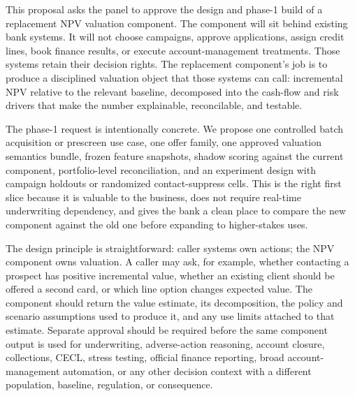 \documentclass[11pt]{article}
\newcommand{\1}{\mathbf{1}}
\begin{document}
This proposal asks the panel to approve the design and phase-1 build of a
replacement NPV valuation component. The component will sit behind existing
bank systems. It will not choose campaigns, approve applications, assign credit
lines, book finance results, or execute account-management treatments. Those
systems retain their decision rights. The replacement component's job is to
produce a disciplined valuation object that those systems can call: incremental
NPV relative to the relevant baseline, decomposed into the cash-flow and risk
drivers that make the number explainable, reconcilable, and testable.

The phase-1 request is intentionally concrete. We propose one controlled batch
acquisition or prescreen use case, one offer family, one approved valuation
semantics bundle, frozen feature snapshots, shadow scoring against the current
component, portfolio-level reconciliation, and an experiment design with
campaign holdouts or randomized contact-suppress cells. This is the right first
slice because it is valuable to the business, does not require real-time
underwriting dependency, and gives the bank a clean place to compare the new
component against the old one before expanding to higher-stakes uses.

The design principle is straightforward: caller systems own actions; the NPV
component owns valuation. A caller may ask, for example, whether contacting a
prospect has positive incremental value, whether an existing client should be
offered a second card, or which line option changes expected value. The
component should return the value estimate, its decomposition, the policy and
scenario assumptions used to produce it, and any use limits attached to that
estimate. Separate approval should be required before the same component output
is used for underwriting, adverse-action reasoning, account closure,
collections, CECL, stress testing, official finance reporting, broad
account-management automation, or any other decision context with a different
population, baseline, regulation, or consequence.
\end{document}
